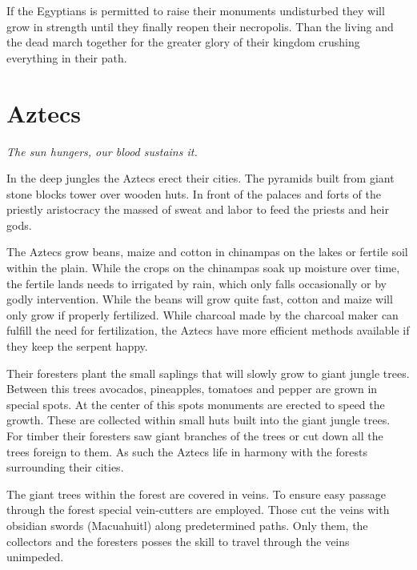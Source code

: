\documentclass[a4paper]{book}
\begin{document}
If the \gls{Egyptians} is permitted to raise their monuments undisturbed they
will grow in strength until they finally reopen their necropolis. Than the
living and the dead march together for the greater glory of their kingdom
crushing everything in their path.

\section{\Gls{Aztecs}}

\begin{flushright}
	\emph{The sun hungers, our blood sustains it.}
\end{flushright}

In the deep jungles the \gls{Aztecs} erect their cities. The pyramids built
from giant stone blocks tower over wooden huts. In front of the palaces and
forts of the priestly aristocracy the massed of sweat and labor to feed the
priests and heir gods.

The \gls{Aztecs} grow beans, maize and cotton in chinampas on the lakes or
fertile soil within the plain. While the crops on the chinampas soak up
moisture over time, the fertile lands needs to irrigated by rain, which only
falls occasionally or by godly intervention. While the beans will grow quite
fast, cotton and maize will only grow if properly fertilized. While charcoal
made by the charcoal maker can fulfill the need for fertilization, the
\gls{Aztecs} have more efficient methods available if they keep the serpent
happy.

Their foresters plant the small saplings that will slowly grow to giant jungle
trees. Between this trees avocados, pineapples, tomatoes and pepper are grown
in special spots. At the center of this spots monuments are erected to speed
the growth. These are collected within small huts built into the giant jungle
trees. For timber their foresters saw giant branches of the trees or cut down
all the trees foreign to them. As such the \gls{Aztecs} life in harmony with
the forests surrounding their cities.

The giant trees within the forest are covered in veins. To ensure easy passage
through the forest special vein-cutters are employed. Those cut the veins with
obsidian swords (Macuahuitl) along predetermined paths. Only them, the
collectors and the foresters posses the skill to travel through the veins
unimpeded.
\end{document}
